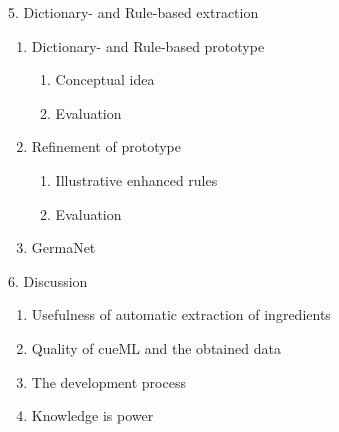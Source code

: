 \documentclass[12pt]{beamer}
\begin{document}
\begin{frame}{5. Dictionary- and Rule-based extraction}
	\begin{enumerate}
		\item Dictionary- and Rule-based prototype
		\begin{enumerate}
			\item Conceptual idea
			\item Evaluation
		\end{enumerate}
		\item Refinement of prototype
		\begin{enumerate}
			\item Illustrative enhanced rules
			\item Evaluation
		\end{enumerate}
		\item GermaNet
	\end{enumerate}
\end{frame}

\begin{frame}{6. Discussion}
	\begin{enumerate}
		\item Usefulness of automatic extraction of ingredients
		\item Quality of cueML and the obtained data
		\item The development process
		\item Knowledge is power
	\end{enumerate}
\end{frame}
\end{document}
